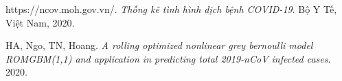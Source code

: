 ﻿\documentclass{article}
\begin{document}
\pagebreak

\begin{thebibliography}{}

https://ncov.moh.gov.vn/. 
\textit{Thống kê tình hình dịch bệnh COVID-19}. 
Bộ Y Tế, Việt Nam, 2020.

HA, Ngo, TN, Hoang.
\textit{A rolling optimized nonlinear grey bernoulli model ROMGBM(1,1) and application in predicting total 2019-nCoV infected cases}.
2020.
\end{thebibliography}
\end{document}
